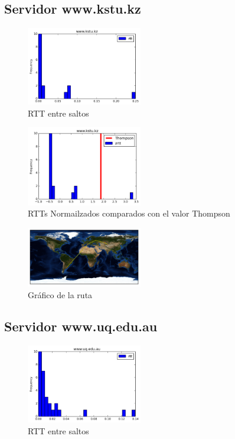 \subsection{Servidor www.kstu.kz}
\begin{figure}[H]
  \centering
    \includegraphics[width=0.45\textwidth]{histogramas_rtt/www-kstu-kz.png}
  \caption{RTT entre saltos}
  \label{entropia-s}
\end{figure}

\begin{figure}[H]
  \centering
    \includegraphics[width=0.45\textwidth]{histogramas_thompson/www-kstu-kz.png}
  \caption{RTTs Normailzados comparados con el valor Thompson}
  \label{entropia-s}
\end{figure}

\begin{figure}[H]
  \centering
    \includegraphics[width=0.45\textwidth]{grafico-rutas/www-kstu-kz.png}
  \caption{Gráfico de la ruta}
  \label{entropia-s}
\end{figure}




\subsection{Servidor www.uq.edu.au}
\begin{figure}[H]
  \centering
    \includegraphics[width=0.45\textwidth]{histogramas_rtt/www-uq-edu-au.png}
  \caption{RTT entre saltos}
  \label{entropia-s}
\end{figure}

